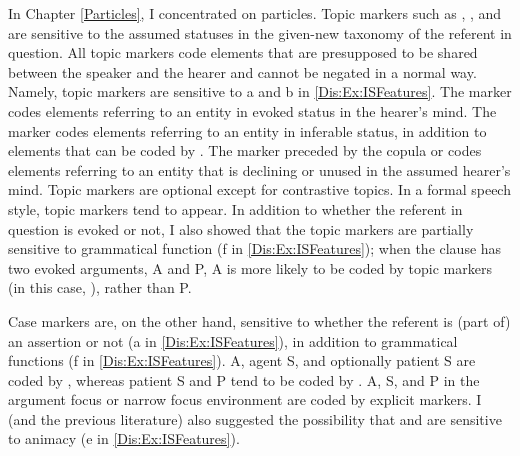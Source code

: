 In Chapter \ref{Particles},
I concentrated on particles.
Topic markers such as , , and 
are sensitive to the assumed statuses in the given-new taxonomy of the referent in question.
All topic markers code elements that are presupposed to be
shared between the speaker and the hearer
and cannot be negated in a normal way.
Namely, topic markers are sensitive to
a and b in \ref{Dis:Ex:ISFeatures}.
The marker  codes elements referring to an entity in evoked status in the hearer's mind.
The marker  codes elements referring to an entity in inferable status,
in addition to elements that can be coded by .
The marker  preceded by the copula  or 
codes elements referring to an entity that is declining or unused in the assumed hearer's mind.
Topic markers are optional except for contrastive topics.
In a formal speech style,
topic markers tend to appear.
In addition to whether the referent in question is evoked or not,
I also showed that the topic markers are partially sensitive to grammatical function (f in \ref{Dis:Ex:ISFeatures});
when the clause has two evoked arguments, A and P,
A is more likely to be coded by topic markers (in this case, ),
rather than P.

Case markers are, on the other hand, sensitive to whether the referent is (part of) an assertion or not (a in \ref{Dis:Ex:ISFeatures}),
in addition to grammatical functions (f in \ref{Dis:Ex:ISFeatures}).
A, agent S, and optionally patient S are coded by ,
whereas patient S and P tend to be coded by \ci{\O}.
A, S, and P in the argument focus or narrow focus environment are coded by explicit markers.
I (and the previous literature) also suggested the possibility that
 and  are sensitive to animacy (e in \ref{Dis:Ex:ISFeatures}).

